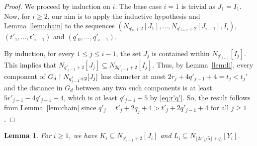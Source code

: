 \documentclass[12pt,a4paper]{amsart}
\numberwithin{equation}{section}
\newtheorem{lemma}[equation]{Lemma}
\theoremstyle{definition}
\begin{document}
\begin{proof}
We proceed by induction on $i$. The base case $i=1$ is trivial as $J_1=I_1$.  Now, for $i\geq2$, our aim is to apply the inductive hypothesis and Lemma~\ref{lem:chain} to the sequences $(N_{q'_0+2}[J_1],\dots,N_{q'_{i-2}+2}[J_{i-1}],I_i)$, $(t'_1,\dots,t'_{i-1})$ and $(q'_0,\dots,q'_{i-1})$. 

By induction, for every $1\leq j\leq i-1$, the set $J_j$ is contained within $N_{q'_{j-1}}[I_j]$. This implies that $N_{q'_{j-1}+2}[J_j]\subseteq N_{2q'_{j-1}+2}[I_j]$. Thus, by Lemma~\ref{lem:Ii}, every component of $G_d\upharpoonright N_{q'_{j-1}+2}[J_j]$ has diameter at most $2r_j+4q'_{j-1}+4=t_j< t_j'$ and the distance in $G_d$ between any two such components is at least $5r'_{j-1}-4q'_{j-1}-4$, which is at least $q'_{j-1}+5$ by \eqref{eq:r'q'}. So, the result follows from Lemma~\ref{lem:chain} since $q'_j = t'_j+2q_j+4>t'_j+2q'_{j-1}+4$ for all $j\geq1$.
\end{proof}

\begin{lemma}
\label{lem:KiLi}
For $i\geq1$, we have $K_i\subseteq N_{q'_{i-1}+2}[J_i]$ and $L_i\subseteq N_{\lfloor 2r'_i/5\rfloor+q_{i}}[Y_i]$. 
\end{lemma}
\end{document}
